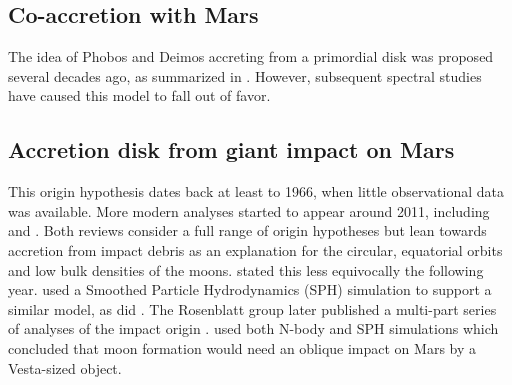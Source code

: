 
\subsection{Co-accretion with Mars}

The idea of Phobos and Deimos accreting from a primordial disk was proposed several decades ago, as summarized in \citet{burns_contradictory_1992}. However, subsequent spectral studies have caused this model to fall out of favor.

\subsection{Accretion disk from giant impact on Mars}

This origin hypothesis dates back at least to 1966, when little observational data was available. More modern analyses started to appear around 2011, including \citet{craddock_are_2011} and  \citet{rosenblatt_origin_2011}. Both reviews consider a full range of origin hypotheses but lean towards accretion from impact debris as an explanation for the circular, equatorial orbits and low bulk densities of the moons.  \citet{rosenblatt_formation_2012} stated this less equivocally the following year. \citet{citron_formation_2015} used a Smoothed Particle Hydrodynamics (SPH) simulation to support a similar model, as did \citet{rosenblatt_accretion_2016}. The Rosenblatt group later published a multi-part series of analyses of the impact origin \citep{hyodo_impact_2017, hyodo_impact_2017-1, hyodo_impact_2018}. \citet{canup_origin_2018} used both N-body and SPH simulations which concluded that moon formation would need an oblique impact on Mars by a Vesta-sized object.




{}

	
	


